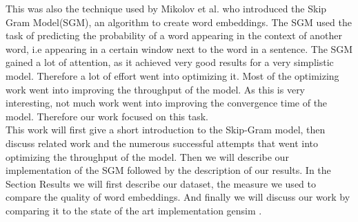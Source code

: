This was also the technique used by Mikolov et al. \cite{mikolov} who  introduced the Skip Gram Model(SGM), an algorithm to create word embeddings. The SGM used the task of predicting the probability of a word appearing in the context of another word, i.e appearing in a certain window next to the word in a sentence. The SGM gained a lot of attention, as it achieved very good results for a very simplistic model. Therefore a lot of effort went into optimizing it. Most of the optimizing work went into improving the throughput of the model. As this is very interesting, not much work went into improving the convergence time of the model. Therefore our work focused on this task.\\

This work will first give a short introduction to the Skip-Gram model, then discuss related work and the numerous successful attempts that went into optimizing the throughput of the model. Then we will describe our implementation of the SGM followed by the description of our results. In the Section Results we will first describe our dataset, the measure we used to compare the quality of word embeddings. And finally we will discuss our work by comparing it to the state of the art implementation gensim \cite{gensim}. 

  














